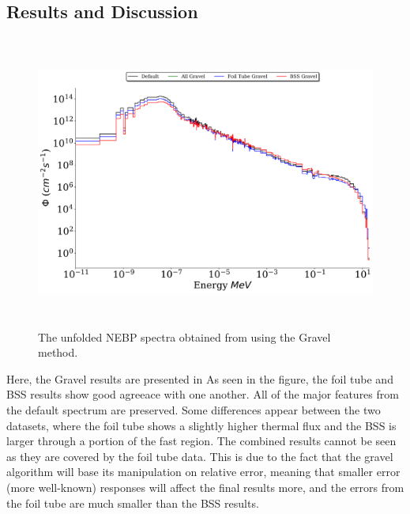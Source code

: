 \subsection{Results and Discussion}


\begin{figure}[htb]
\includegraphics[height=3.8in]{tex/figures/unfolded_gr.png}
\caption[Gravel Unfolded Spectra]{The unfolded NEBP spectra obtained from using the Gravel method.}
\label{fig:unfolded_gr}
\end{figure}

Here, the Gravel results are presented in 
As seen in the figure, the foil tube and BSS results show good agreeace with one another.
All of the major features from the default spectrum are preserved.
Some differences appear between the two datasets, where the foil tube shows a slightly higher thermal flux and the BSS is larger through a portion of the fast region.
The combined results cannot be seen as they are covered by the foil tube data.
This is due to the fact that the gravel algorithm will base its manipulation on relative error, meaning that smaller error (more well-known) responses will affect the final results more, and the errors from the foil tube are much smaller than the BSS results.

